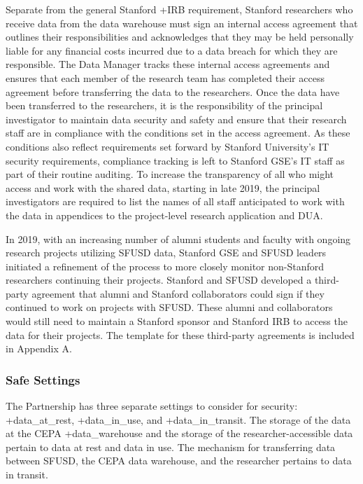 \documentclass[
]{WileySix}
\begin{document}
Separate from the general Stanford +IRB\textbar{} requirement, Stanford researchers who receive data from the data warehouse must sign an internal access agreement that outlines their responsibilities and acknowledges that they may be held personally liable for any financial costs incurred due to a data breach for which they are responsible. The Data Manager tracks these internal access agreements and ensures that each member of the research team has completed their access agreement before transferring the data to the researchers. Once the data have been transferred to the researchers, it is the responsibility of the principal investigator to maintain data security and safety and ensure that their research staff are in compliance with the conditions set in the access agreement. As these conditions also reflect requirements set forward by Stanford University's IT security requirements, compliance tracking is left to Stanford GSE's IT staff as part of their routine auditing. To increase the transparency of all who might access and work with the shared data, starting in late 2019, the principal investigators are required to list the names of all staff anticipated to work with the data in appendices to the project-level research application and DUA.

In 2019, with an increasing number of alumni students and faculty with ongoing research projects utilizing SFUSD data, Stanford GSE and SFUSD leaders initiated a refinement of the process to more closely monitor non-Stanford researchers continuing their projects. Stanford and SFUSD developed a third-party agreement that alumni and Stanford collaborators could sign if they continued to work on projects with SFUSD. These alumni and collaborators would still need to maintain a Stanford sponsor and Stanford IRB to access the data for their projects. The template for these third-party agreements is included in Appendix A.

\hypertarget{safe-settings-5}{%
\subsubsection{Safe Settings}\label{safe-settings-5}}

The Partnership has three separate settings to consider for security: +data\_at\_rest\textbar, +data\_in\_use\textbar, and +data\_in\_transit\textbar. The storage of the data at the CEPA +data\_warehouse\textbar{} and the storage of the researcher-accessible data pertain to data at rest and data in use. The mechanism for transferring data between SFUSD, the CEPA data warehouse, and the researcher pertains to data in transit.
\end{document}
